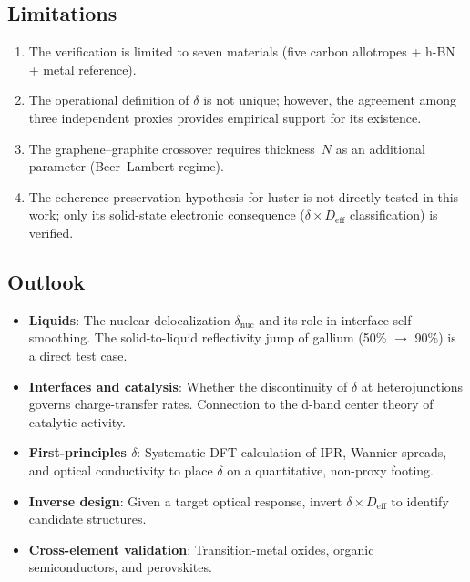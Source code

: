 \documentclass[twocolumn,showpacs,preprintnumbers,amsmath,amssymb,prb]{revtex4-2}
\begin{document}
\subsection{Limitations}

\begin{enumerate}
  \item The verification is limited to seven materials (five carbon
    allotropes + h-BN + metal reference).
  \item The operational definition of $\delta$ is not unique; however,
    the agreement among three independent proxies provides empirical
    support for its existence.
  \item The graphene--graphite crossover requires thickness~$N$ as
    an additional parameter (Beer--Lambert regime).
  \item The coherence-preservation hypothesis for luster is not
    directly tested in this work; only its solid-state electronic
    consequence ($\delta \times D_\mathrm{eff}$ classification) is
    verified.
\end{enumerate}

\subsection{Outlook}

\begin{itemize}
  \item \textbf{Liquids}: The nuclear delocalization
    $\delta_\mathrm{nuc}$ and its role in interface self-smoothing.
    The solid-to-liquid reflectivity jump of gallium (50\% $\to$ 90\%)
    is a direct test case.
  \item \textbf{Interfaces and catalysis}: Whether the discontinuity
    of $\delta$ at heterojunctions governs charge-transfer rates.
    Connection to the d-band center theory of catalytic activity.
  \item \textbf{First-principles $\delta$}: Systematic DFT calculation
    of IPR, Wannier spreads, and optical conductivity to place $\delta$
    on a quantitative, non-proxy footing.
  \item \textbf{Inverse design}: Given a target optical response,
    invert $\delta \times D_\mathrm{eff}$ to identify candidate
    structures.
  \item \textbf{Cross-element validation}: Transition-metal oxides,
    organic semiconductors, and perovskites.
\end{itemize}

\end{document}
